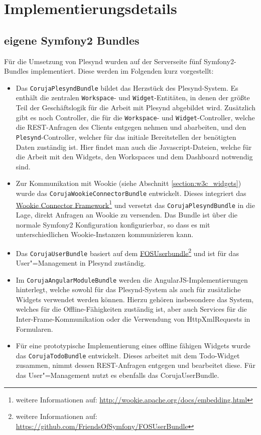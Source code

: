 \section{Implementierungsdetails}\label{section:implementierungsdetails}

\subsection{eigene Symfony2 Bundles}\label{section:backend}
Für die Umsetzung von Plesynd wurden auf der Serverseite fünf Symfony2-Bundles implementiert. Diese werden im Folgenden kurz vorgestellt:

\begin{itemize}
\item Das \texttt{CorujaPlesyndBundle} bildet das Herzstück des Plesynd-System. Es enthält die zentralen \texttt{Workspace}- und \texttt{Widget}-Entitäten, in denen der größte Teil der Geschäftslogik für die Arbeit mit Plesynd abgebildet wird. Zusätzlich gibt es noch Controller, die für die \texttt{Workspace}- und \texttt{Widget}-Controller, welche die REST-Anfragen des Clients entgegen nehmen und abarbeiten, und den \texttt{Plesynd}-Controller, welcher für das initiale Bereitstellen der benötigten Daten zuständig ist. Hier findet man auch die Javascript-Dateien, welche für die Arbeit mit den Widgets, den Workspaces und dem Dashboard notwendig sind.
\item Zur Kommunikation mit Wookie (siehe Abschnitt \ref{section:w3c_widgets}) wurde das \texttt{Coruja\allowbreak Wookie\allowbreak Connector\allowbreak Bundle} entwickelt. Dieses integriert das \href{http://wookie.apache.org/docs/embedding.html}{Wookie Connector Framework}\footnote{weitere Informationen auf: \url{http://wookie.apache.org/docs/embedding.html}} und versetzt das \texttt{CorujaPlesyndBundle} in die Lage, direkt Anfragen an Wookie zu versenden. Das Bundle ist über die normale Symfony2 Konfiguration konfigurierbar, so dass es mit unterschiedlichen Wookie-Instanzen kommunizieren kann.
\item Das \texttt{CorujaUserBundle} basiert auf dem \href{https://github.com/FriendsOfSymfony/FOSUserBundle}{FOSUserbundle}\footnote{weitere Informationen auf: \url{https://github.com/FriendsOfSymfony/FOSUserBundle}} und ist für das User"=Management in Plesynd zuständig.
\item Im \texttt{CorujaAngularModuleBundle} werden die AngularJS-Implementierungen hinterlegt, welche sowohl für das Plesynd-System als auch für zusätzliche Widgets verwendet werden können. Hierzu gehören insbesondere das System, welches für die Offline-Fähigkeiten zuständig ist, aber auch Services für die Inter-Frame-Kommunikation oder die Verwendung von HttpXmlRequests in Formularen.  
\item Für eine prototypische Implementierung eines offline fähigen Widgets wurde das \texttt{CorujaTodoBundle} entwickelt. Dieses arbeitet mit dem Todo-Widget zusammen, nimmt dessen REST-Anfragen entgegen und bearbeitet diese. Für das User"=Management nutzt es ebenfalls das CorujaUserBundle.
\end{itemize}

